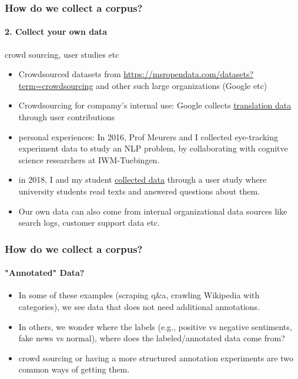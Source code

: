 \documentclass{beamer}
\begin{document}
\begin{frame}
\frametitle{How do we collect a corpus?}
\framesubtitle{2. Collect your own data}
crowd sourcing, user studies etc
\begin{itemize}
    \item Crowdsourced datasets from \href{Microsoft}{https://msropendata.com/datasets?term=crowdsourcing} and other such large organizations (Google etc) \pause
    \item Crowdsourcing for compamy's internal use: Google collects \href{https://translate.google.com/contribute}{translation data} through user contributions
    \pause \item personal experiences:  In 2016, Prof Meurers and I collected eye-tracking experiment data to study an NLP problem, by collaborating with cognitve science researchers at IWM-Tuebingen. 
    \item in 2018, I and my student \href{https://github.com/nishkalavallabhi/BEA19UserstudyData}{collected data} through a user study where university students read texts and answered questions about them. \pause
    \item Our own data can also come from internal organizational data sources like search logs, customer support data etc. 
\end{itemize}
\end{frame}

\begin{frame}
\frametitle{How do we collect a corpus?}
\framesubtitle{"Annotated" Data?}
\begin{itemize}
    \item In some of these examples (scraping q\&a, crawling Wikipedia with categories), we see data that does not need additional annotations. \pause
    \item In others, we wonder where the labels (e.g., positive vs negative sentiments, fake news vs normal), where does the labeled/annotated data come from? \pause
    \item crowd sourcing or having a more structured annotation experiments are two common ways of getting them.
\end{itemize}
\end{frame}
\end{document}
